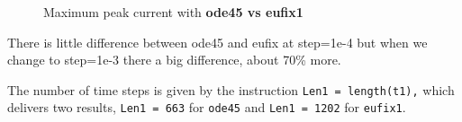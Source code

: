 \documentclass[]{article}
\begin{document}
\begin{figure}
	\centering
	\caption{Maximum peak current with \textbf{ode45 vs eufix1}}
	\label{fig:ode45_vs_eufix1}
\end{figure}

There is little difference between ode45 and eufix at step=1e-4 but when we change to step=1e-3 there a big difference, about 70\% more.

The number of time steps is given by the instruction \verb|Len1 = length(t1),| which delivers two results, \verb|Len1 = 663| for \verb|ode45| and \verb|Len1 = 1202| for \verb|eufix1|.
\end{document}
